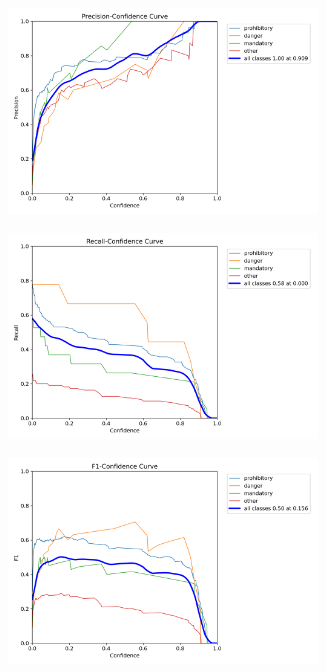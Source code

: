 \documentclass{article}
\begin{document}
\begin{figure}[h]
\begin{subfigure}[b]{0.5\textwidth}
\centering
\includegraphics[width=0.9\textwidth]{resources/cuban in general P curve.png}
\caption{}
\end{subfigure}
\begin{subfigure}[b]{0.5\textwidth}
\centering
\includegraphics[width=0.9\textwidth]{resources/cuban in general R curve.png}
\caption{}
\end{subfigure}
\begin{subfigure}[b]{0.5\textwidth}
\centering
\includegraphics[width=0.9\textwidth]{resources/cuban in general F1 curve.png}

\end{subfigure}
\end{figure}
\end{document}
